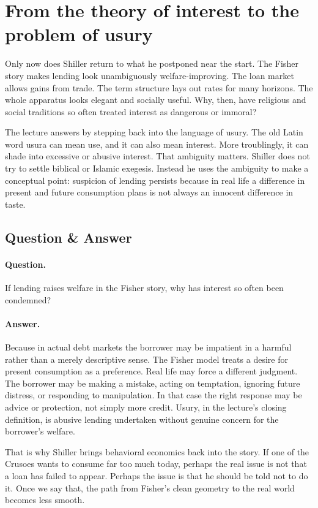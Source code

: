 \section{From the theory of interest to the problem of usury}

Only now does Shiller return to what he postponed near the start. The Fisher story makes lending look unambiguously welfare-improving. The loan market allows gains from trade. The term structure lays out rates for many horizons. The whole apparatus looks elegant and socially useful. Why, then, have religious and social traditions so often treated interest as dangerous or immoral?

The lecture answers by stepping back into the language of usury. The old Latin word usura can mean use, and it can also mean interest. More troublingly, it can shade into excessive or abusive interest. That ambiguity matters. Shiller does not try to settle biblical or Islamic exegesis. Instead he uses the ambiguity to make a conceptual point: suspicion of lending persists because in real life a difference in present and future consumption plans is not always an innocent difference in taste.

\subsection{Question \& Answer}

\paragraph{Question.} If lending raises welfare in the Fisher story, why has interest so often been condemned?

\paragraph{Answer.} Because in actual debt markets the borrower may be impatient in a harmful rather than a merely descriptive sense. The Fisher model treats a desire for present consumption as a preference. Real life may force a different judgment. The borrower may be making a mistake, acting on temptation, ignoring future distress, or responding to manipulation. In that case the right response may be advice or protection, not simply more credit. Usury, in the lecture's closing definition, is abusive lending undertaken without genuine concern for the borrower's welfare.

That is why Shiller brings behavioral economics back into the story. If one of the Crusoes wants to consume far too much today, perhaps the real issue is not that a loan has failed to appear. Perhaps the issue is that he should be told not to do it. Once we say that, the path from Fisher's clean geometry to the real world becomes less smooth.

